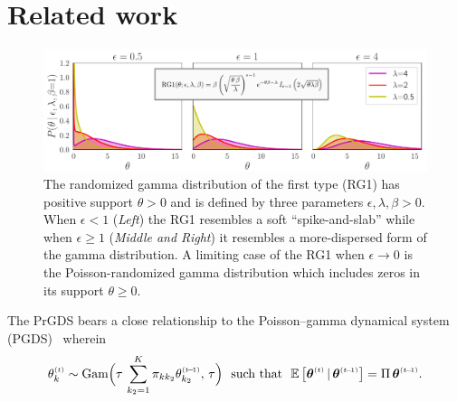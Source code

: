 \documentclass{article}
\begin{document}
\section{Related work}
\label{sec:bg}
\begin{figure}[t]
\centering
\includegraphics[width=\linewidth]{../../fig/distributions/annotated_rg1.pdf}
\caption{\footnotesize \label{fig:rg1} The randomized gamma distribution of the first type (RG1) \cite{yuan2000bessel,makarov2010exact} has positive support $\theta \!>\!  0$ and is defined by three parameters $\epsilon,\lambda,\beta \!>\! 0$. When $\epsilon < 1$ (\emph{Left}) the RG1 resembles a soft ``spike-and-slab'' while when $\epsilon \geq 1$ (\emph{Middle and Right}) it resembles a more-dispersed form of the gamma distribution. A limiting case of the RG1 when $\epsilon \!\rightarrow\! 0$ is the Poisson-randomized gamma distribution \cite{zhou2016augmentable} which includes zeros in its support $\theta \geq 0$.~}
\end{figure}
The PrGDS bears a close relationship to the Poisson--gamma dynamical system (PGDS)~\citep{schein2016poisson} wherein~
\begin{equation}
\label{eq:pgds}
\thetakt \sim \textrm{Gam}\Big(\tau\,\sum_{k_2=1}^K \pi_{kk_2} \thetakttm,\, \tau\Big)\,\,\textrm{ such that }\,\,
% 
\mathbb{E}\left[\boldsymbol{\theta}^{\mathsmaller{(t)}} \given \boldsymbol{\theta}^{\mathsmaller{(t \tm 1)}}\right]= \Pi \, \boldsymbol{\theta}^{\mathsmaller{(t \tm 1)}}.
\end{equation}
\end{document}
